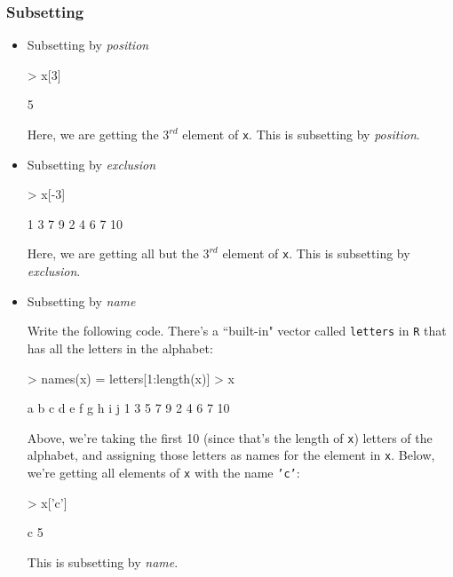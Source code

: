 \documentclass{exam}
\begin{document}
\subsubsection{Subsetting}
\begin{itemize}
\item Subsetting by \textit{position}

\begin{Schunk}
\begin{Sinput}
> x[3]  
\end{Sinput}
\begin{Soutput}
[1] 5
\end{Soutput}
\end{Schunk}
Here, we are getting the $3^{rd}$ element of \texttt{x}. This is subsetting by \textit{position}.

\item Subsetting by \textit{exclusion}

\begin{Schunk}
\begin{Sinput}
> x[-3]  
\end{Sinput}
\begin{Soutput}
[1]  1  3  7  9  2  4  6  7 10
\end{Soutput}
\end{Schunk}

Here, we are getting all but the $3^{rd}$ element of \texttt{x}. This is subsetting by \textit{exclusion}.

\item Subsetting by \textit{name}

Write the following code. There's a ``built-in" vector called \texttt{letters} in \texttt{R} that has all the letters in the alphabet:
\begin{Schunk}
\begin{Sinput}
> names(x) = letters[1:length(x)]
> x
\end{Sinput}
\begin{Soutput}
 a  b  c  d  e  f  g  h  i  j 
 1  3  5  7  9  2  4  6  7 10 
\end{Soutput}
\end{Schunk}
Above, we're taking the first 10 (since that's the length of \texttt{x}) letters of the alphabet, and assigning those letters as names for the element in \texttt{x}. Below, we're getting all elements of \texttt{x} with the name \texttt{'c'}:

\begin{Schunk}
\begin{Sinput}
> x['c']  
\end{Sinput}
\begin{Soutput}
c 
5 
\end{Soutput}
\end{Schunk}
This is subsetting by \textit{name}.


\end{itemize}
\end{document}
